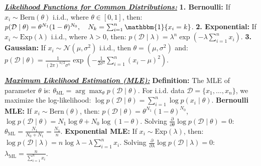 \documentclass[10pt]{article}
\newcommand{\bulletPoint}[1]{\ul{\textit{\textbf{#1}}}}
\begin{document}
\begin{multicols*}{2}
\bulletPoint{Likelihood Functions for Common Distributions:}\quad
\textbf{1. Bernoulli:} If $x_i \sim \text{Bern}(\theta)$ i.i.d., where $\theta \in [0,1]$, then:
$p(\mathcal{D} \mid \theta) = \theta^{N_1} (1 - \theta)^{N_0}, \quad N_k = \sum_{i=1}^{n} \mathbbm{1}\{x_i = k\}$. 
\textbf{2. Exponential:} If $x_i \sim \text{Exp}(\lambda)$ i.i.d., where $\lambda > 0$, then:
$p(\mathcal{D} \mid \lambda) = \lambda^n \exp \left( -\lambda \sum_{i=1}^{n} x_i \right)$. 
\textbf{3. Gaussian:} If $x_i \sim \mathcal{N}(\mu, \sigma^2)$ i.i.d., then $\theta = (\mu, \sigma^2)$ and:
$p(\mathcal{D} \mid \theta) = \frac{1}{(2\pi)^{n/2} \sigma^n} \exp \left( -\frac{1}{2\sigma^2} \sum_{i=1}^{n} (x_i - \mu)^2 \right)$.


\bulletPoint{Maximum Likelihood Estimation (MLE):}\quad
\textbf{Definition:} The MLE of parameter $\theta$ is: $\theta_{\text{ML}} = \arg\max_{\theta} p(\mathcal{D} \mid \theta)$.
For i.i.d. data $\mathcal{D} = \{x_1, \dots, x_n\}$, we maximize the log-likelihood:
$\log p(\mathcal{D} \mid \theta) = \sum_{i=1}^{n} \log p(x_i \mid \theta)$. 
\textbf{Bernoulli MLE:} If $x_i \sim \text{Bern}(\theta)$, then: $p(\mathcal{D} \mid \theta) = \theta^{N_1} (1 - \theta)^{N_0}$,
$\log p(\mathcal{D} \mid \theta) = N_1 \log \theta + N_0 \log (1 - \theta)$. Solving $\frac{\partial}{\partial \theta} \log p(\mathcal{D} \mid \theta) = 0$:
$\theta_{\text{ML}} = \frac{N_1}{N_0 + N_1} = \frac{N_1}{n}$. 
\textbf{Exponential MLE:} If $x_i \sim \text{Exp}(\lambda)$, then: $\log p(\mathcal{D} \mid \lambda) = n \log \lambda - \lambda \sum_{i=1}^{n} x_i$.
Solving $\frac{\partial}{\partial \lambda} \log p(\mathcal{D} \mid \lambda) = 0$: $\lambda_{\text{ML}} = \frac{n}{\sum_{i=1}^{n} x_i}$.



\end{multicols*}
\end{document}
